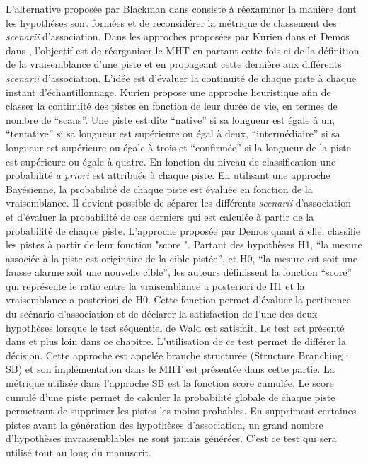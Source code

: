 \documentclass[10pt,french,a4paper]{report}
\begin{document}
L'alternative proposée par Blackman dans \cite{Blackman1986} consiste à réexaminer la manière dont les hypothéses sont formées et de reconsidérer la métrique de classement des \textit{scenarii} d'association. Dans les approches proposées par Kurien dans \cite{Kurien1990} et Demos dans \cite{Demos1990}, l'objectif est de réorganiser le \ac{MHT} en partant cette fois-ci de la définition de la vraisemblance d'une piste et en propageant cette dernière aux différents \textit{scenarii} d'association. L'idée est d'évaluer la continuité de chaque piste à chaque instant d'échantillonnage. Kurien propose une approche heuristique afin de classer la continuité des pistes en fonction de leur durée de vie, en termes de nombre de ``scans''. Une piste est dite ``native'' si sa longueur est égale à un, ``tentative'' si sa longueur est supérieure ou égal à deux, ``intermédiaire'' si sa longueur est supérieure ou égale à trois et ``confirmée'' si la longueur de la piste est supérieure ou égale à quatre. En fonction du niveau de classification une probabilité \textit{a priori} est attribuée à chaque piste. En utilisant une approche Bayésienne, la probabilité de chaque piste est évaluée en fonction de la vraisemblance. Il devient possible de séparer les différents \textit{scenarii} d'association et d'évaluer la probabilité de ces derniers qui est calculée à partir de la probabilité de chaque piste. L'approche proposée par Demos quant à elle, classifie les pistes à partir de leur fonction "score ". Partant des hypothèses H1, ``la mesure associée à la piste est originaire de la cible pistée'', et H0, ``la mesure est soit une fausse alarme soit une nouvelle cible'', les auteurs définissent la fonction ``score'' qui représente le ratio entre la vraisemblance a posteriori de H1 et la vraisemblance a posteriori de H0. Cette fonction permet d'évaluer la pertinence du scénario d'association et de déclarer la satisfaction de l'une des deux hypothèses lorsque le test séquentiel de Wald est satisfait. Le test est présenté dans \cite{Blackman1986} et plus loin dans ce chapitre. L'utilisation de ce test permet de différer la décision. Cette approche est appelée branche structurée (Structure Branching : SB) et son implémentation dans le \ac{MHT} est présentée dans cette partie. La métrique utilisée dans l'approche SB est la fonction score cumulée. Le score cumulé d'une piste permet de calculer la probabilité globale de chaque piste permettant de supprimer les pistes les moins probables. En supprimant certaines pistes avant la génération des hypothèses d'association, un grand nombre d'hypothèses invraisemblables ne sont jamais générées. C'est ce test qui sera utilisé tout au long du manuscrit. 
			 
\end{document}
